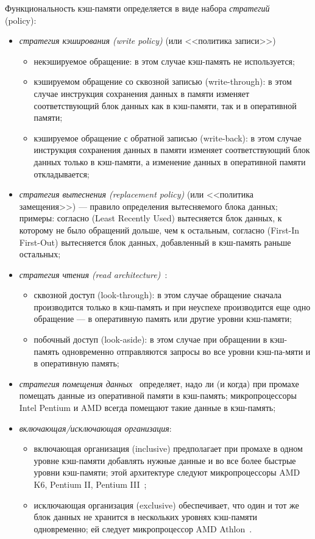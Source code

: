 Функциональность кэш-памяти определяется в виде набора \emph{стратегий}\\ (policy):
\begin{itemize}
	\item \emph{стратегия кэширования (write policy)} (или <<политика записи>>)
		\begin{itemize}
		\item некэшируемое обращение: в этом случае кэш-память не используется;
		\item кэшируемом обращение со сквозной записью (write-through): в этом случае инструкция сохранения данных в памяти изменяет соответствующий блок данных как в кэш-памяти, так и в оперативной памяти;
		\item кэшируемое обращение с обратной записью (write-back): в этом случае инструкция сохранения данных в памяти изменяет соответствующий блок данных только в кэш-памяти, а изменение данных в оперативной памяти откладывается;
		\end{itemize}
	\item \emph{стратегия вытеснения (replacement policy)} (или <<политика замещения>>) --- правило определения вытесняемого блока данных; примеры: согласно \LRU (Least Recently Used) вытесняется блок данных, к которому не было обращений дольше, чем к остальным, согласно \FIFO (First-In First-Out) вытесняется блок данных, добавленный в кэш-память раньше остальных;
	\item \emph{стратегия чтения (read architecture)}~\cite{IntelCache}:
		\begin{itemize}
			\item сквозной доступ (look-through): в этом случае обращение сначала производится только в кэш-память и при неуспехе производится еще одно обращение --- в оперативную память или другие уровни кэш-памяти;
			\item побочный доступ (look-aside): в этом случае при обращении в кэш-память одновременно отправляются запросы во все уровни кэш-па-мяти и в оперативную память;
		\end{itemize}
	\item \emph{стратегия помещения данных}~\cite{Kasperski_EffectiveMemory} определяет, надо ли (и когда) при промахе помещать данные из оперативной памяти в кэш-память; микропроцессоры Intel Pentium и AMD всегда помещают такие данные в кэш-память;
	\item \emph{включающая/исключающая организация}:
		\begin{itemize}
		\item включающая организация (inclusive) предполагает при промахе в одном уровне кэш-памяти добавлять нужные данные и во все более быстрые уровни кэш-памяти; этой архитектуре следуют микропроцессоры AMD K6, Pentium II, Pentium III~\cite{Kasperski_EffectiveMemory};
		\item исключающая организация (exclusive) обеспечивает, что один и тот же блок данных не хранится в нескольких уровнях кэш-памяти одновременно; ей следует микропроцессор AMD Athlon~\cite{Kasperski_EffectiveMemory}.
		\end{itemize}
\end{itemize}

